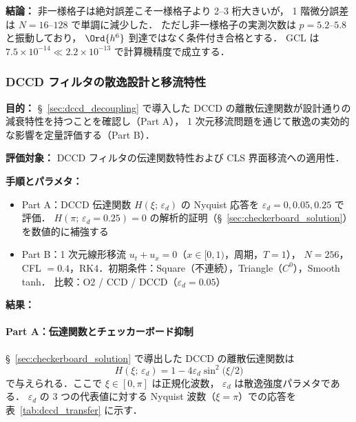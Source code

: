 \noindent\textbf{結論：}
非一様格子は絶対誤差こそ一様格子より 2--3 桁大きいが，
1 階微分誤差は $N=16$--$128$ で単調に減少した．
ただし非一様格子の実測次数は $p = 5.2$--$5.8$ と振動しており，
$\Ord{h^6}$ 到達ではなく条件付き合格とする．
GCL は $7.5 \times 10^{-14} \ll 2.2 \times 10^{-13}$ で計算機精度で成立する．

\subsubsection{DCCD フィルタの散逸設計と移流特性}
\label{sec:verify_dccd_dissipation}
\label{sec:dccd_dissipation_bench}

\noindent\textbf{目的：}
§~\ref{sec:dccd_decoupling} で導入した DCCD の離散伝達関数が設計通りの
減衰特性を持つことを確認し（Part A），
1 次元移流問題を通じて散逸の実効的な影響を定量評価する（Part B）．

\noindent\textbf{評価対象：}
DCCD フィルタの伝達関数特性および CLS 界面移流への適用性．

\noindent\textbf{手順とパラメタ：}
\begin{itemize}[noitemsep]
  \item Part A：DCCD 伝達関数 $H(\xi;\,\varepsilon_d)$ の Nyquist 応答を
        $\varepsilon_d = 0, 0.05, 0.25$ で評価．
        $H(\pi;\,\varepsilon_d = 0.25) = 0$ の解析的証明（§~\ref{sec:checkerboard_solution}）を数値的に補強する
  \item Part B：1 次元線形移流 $u_t + u_x = 0$（$x \in [0,1)$，周期，$T = 1$），
        $N = 256$，CFL $= 0.4$，RK4．初期条件：Square（不連続），Triangle（$C^0$），Smooth tanh．
        比較：O2 / CCD / DCCD（$\varepsilon_d = 0.05$）
\end{itemize}

\noindent\textbf{結果：}

\paragraph{Part A：伝達関数とチェッカーボード抑制}
§~\ref{sec:checkerboard_solution} で導出した DCCD の離散伝達関数は
\begin{equation}
  H(\xi;\,\varepsilon_d) = 1 - 4\varepsilon_d \sin^2\!\bigl(\xi/2\bigr)
  \label{eq:dccd_transfer_verify}
\end{equation}
で与えられる．ここで $\xi \in [0,\pi]$ は正規化波数，
$\varepsilon_d$ は散逸強度パラメタである．
$\varepsilon_d$ の 3 つの代表値に対する Nyquist 波数（$\xi = \pi$）での応答を表~\ref{tab:dccd_transfer} に示す．

